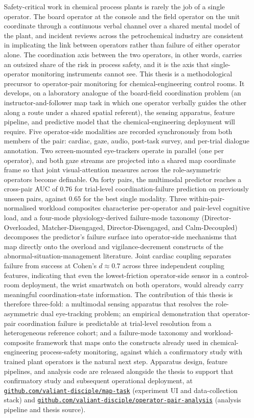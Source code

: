 Safety-critical work in chemical process plants is rarely the job of a single operator. The board operator at the console and the field operator on the unit coordinate through a continuous verbal channel over a shared mental model of the plant, and incident reviews across the petrochemical industry are consistent in implicating the link between operators rather than failure of either operator alone. The coordination axis between the two operators, in other words, carries an outsized share of the risk in process safety, and it is the axis that single-operator monitoring instruments cannot see. This thesis is a methodological precursor to operator-pair monitoring for chemical-engineering control rooms. It develops, on a laboratory analogue of the board-field coordination problem (an instructor-and-follower map task in which one operator verbally guides the other along a route under a shared spatial referent), the sensing apparatus, feature pipeline, and predictive model that the chemical-engineering deployment will require. Five operator-side modalities are recorded synchronously from both members of the pair: cardiac, gaze, audio, post-task survey, and per-trial dialogue annotation. Two screen-mounted eye-trackers operate in parallel (one per operator), and both gaze streams are projected into a shared map coordinate frame so that joint visual-attention measures across the role-asymmetric operators become definable. On forty pairs, the multimodal predictor reaches a cross-pair AUC of $0.76$ for trial-level coordination-failure prediction on previously unseen pairs, against $0.65$ for the best single modality. Three within-pair-normalised workload composites characterise per-operator and pair-level cognitive load, and a four-mode physiology-derived failure-mode taxonomy (Director-Overloaded, Matcher-Disengaged, Director-Disengaged, and Calm-Decoupled) decomposes the predictor's failure surface into operator-side mechanisms that map directly onto the overload and vigilance-decrement constructs of the abnormal-situation-management literature. Joint cardiac coupling separates failure from success at Cohen's $d \approx 0.7$ across three independent coupling features, indicating that even the lowest-friction operator-side sensor in a control-room deployment, the wrist smartwatch on both operators, would already carry meaningful coordination-state information. The contribution of this thesis is therefore three-fold: a multimodal sensing apparatus that resolves the role-asymmetric dual eye-tracking problem; an empirical demonstration that operator-pair coordination failure is predictable at trial-level resolution from a heterogeneous reference cohort; and a failure-mode taxonomy and workload-composite framework that maps onto the constructs already used in chemical-engineering process-safety monitoring, against which a confirmatory study with trained plant operators is the natural next step. Apparatus design, feature pipelines, and analysis code are released alongside the thesis to support that confirmatory study and subsequent operational deployment, at \href{https://github.com/valiant-disciple/map-task}{\texttt{github.com/valiant-disciple/map-task}} (experiment UI and data-collection stack) and \href{https://github.com/valiant-disciple/operator-pair-analysis}{\texttt{github.com/valiant-disciple/operator-pair-analysis}} (analysis pipeline and thesis source).
